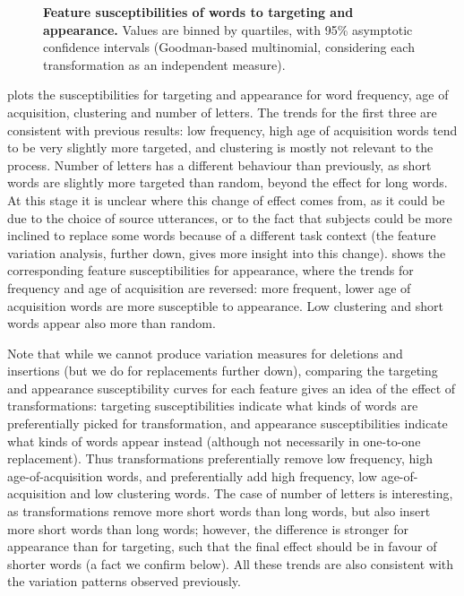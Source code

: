 \documentclass[a4paper,fleqn]{cas-dc}
\begin{document}
\begin{figure}
  \centering

  \caption[Feature susceptibilities of words to targeting and appearance]{
  \textbf{Feature susceptibilities of words to targeting and appearance.}
  Values are binned by quartiles, with 95\% asymptotic confidence intervals (Goodman-based multinomial, considering each transformation as an independent measure).
  }
  \label{fig:gistr-suscept-feature}
\end{figure}

 plots the susceptibilities for
targeting and appearance for word frequency, age of acquisition,
clustering and number of letters. The trends for the first three are
consistent with previous results: low frequency, high age of acquisition
words tend to be very slightly more targeted, and clustering is mostly
not relevant to the process. Number of letters has a different behaviour
than previously, as short words are slightly more targeted than random,
beyond the effect for long words. At this stage it is unclear where this
change of effect comes from, as it could be due to the choice of source
utterances, or to the fact that subjects could be more inclined to
replace some words because of a different task context (the feature
variation analysis, further down, gives more insight into this change).
 shows the corresponding feature
susceptibilities for appearance, where the trends for frequency and age
of acquisition are reversed: more frequent, lower age of acquisition
words are more susceptible to appearance. Low clustering and short words
appear also more than random.

Note that while we cannot produce variation measures for deletions and
insertions (but we do for replacements further down), comparing the
targeting and appearance susceptibility curves for each feature gives an
idea of the effect of transformations: targeting susceptibilities
indicate what kinds of words are preferentially picked for
transformation, and appearance susceptibilities indicate what kinds of
words appear instead (although not necessarily in one-to-one
replacement). Thus transformations preferentially remove low frequency,
high age-of-acquisition words, and preferentially add high frequency,
low age-of-acquisition and low clustering words. The case of number of
letters is interesting, as transformations remove more short words than
long words, but also insert more short words than long words; however,
the difference is stronger for appearance than for targeting, such that
the final effect should be in favour of shorter words (a fact we confirm
below). All these trends are also consistent with the variation patterns
observed previously.
\end{document}
